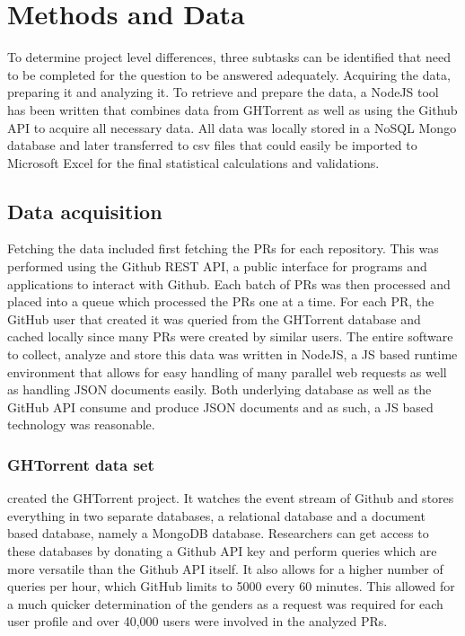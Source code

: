 \section{Methods and Data}

To determine project level differences, three subtasks can be identified that need to be completed for the question to be answered adequately. Acquiring the data, preparing it and analyzing it. To retrieve and prepare the data, a NodeJS tool has been written that combines data from GHTorrent as well as using the Github \ac{API} to acquire all necessary data. All data was locally stored in a NoSQL Mongo database and later transferred to \ac{csv} files that could easily be imported to Microsoft Excel for the final statistical calculations and validations.

\subsection{Data acquisition}

Fetching the data included first fetching the \ac{PR}s for each repository. This was performed using the Github REST \ac{API}, a public interface for programs and applications to interact with Github. Each batch of \ac{PR}s was then processed and placed into a queue which processed the \ac{PR}s one at a time. For each \ac{PR}, the GitHub user that created it was queried from the GHTorrent database and cached locally since many \ac{PR}s were created by similar users. The entire software to collect, analyze and store this data was written in NodeJS, a \ac{JS} based runtime environment that allows for easy handling of many parallel web requests as well as handling \ac{JSON} documents easily. Both underlying database as well as the GitHub \ac{API} consume and produce \ac{JSON} documents and as such, a \ac{JS} based technology was reasonable.

\subsubsection{GHTorrent data set}

\citeauthor{Gousi13} created the GHTorrent project. It watches the event stream of Github and stores everything in two separate databases, a relational database and a document based database, namely a MongoDB database. Researchers can get access to these databases by donating a Github \ac{API} key and perform queries which are more versatile than the Github \ac{API} itself. It also allows for a higher number of queries per hour, which GitHub limits to 5000 every 60 minutes. This allowed for a much quicker determination of the genders as a request was required for each user profile and over 40,000 users were involved in the analyzed \ac{PR}s.


